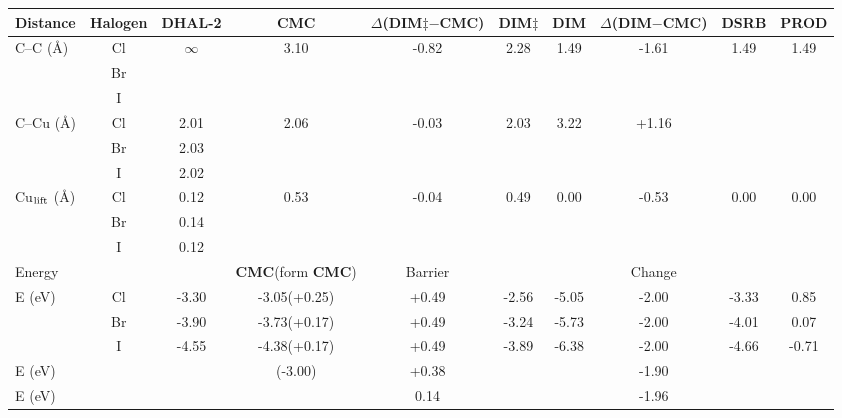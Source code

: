 \documentclass[%
 reprint,
 amsmath,amssymb,
 aps,
prb,
floatfix,
]{revtex4-2}
\begin{document}
\begin{table}
\centering
\begin{tabular}{ lccccccccc  }
 \hline
 \hline
 Distance & Halogen & \textbf{DHAL-2} & \textbf{CMC} & $\Delta$(\textbf{DIM$\ddagger$}$-$\textbf{CMC}) & \textbf{DIM$\ddagger$} & \textbf{DIM} & $\Delta$(\textbf{DIM}$-$\textbf{CMC}) & \textbf{DSRB} & \textbf{PROD}\\ 
 \hline 
 \multirow{3}{*}{C--C (\si{\angstrom})} & Cl & \multirow{3}{*}{$\infty$} & \multirow{3}{*}{3.10} & \multirow{3}{*}{-0.82} & \multirow{3}{*}{2.28} & \multirow{3}{*}{1.49} & \multirow{3}{*}{-1.61} & \multirow{3}{*}{1.49} &\multirow{3}{*}{1.49}\\ 
 & Br & &  &  &  & & & &\\ 
 & I & &  &  &  & & & &\\ 
 \hline
 \multirow{3}{*}{C--Cu (\si{\angstrom}) } & Cl & 2.01 & \multirow{3}{*}{2.06} & \multirow{3}{*}{-0.03} & \multirow{3}{*}{2.03} & \multirow{3}{*}{3.22} & \multirow{3}{*}{+1.16} & \multirow{3}{*}{} &\multirow{3}{*}{}\\ 
 & Br & 2.03 &  &  &  & & & &\\ 
 & I &2.02 &  &  &  & & & &\\ 
 \hline
 \multirow{3}{*}{Cu$_{\rm lift}$ (\si{\angstrom}) } & Cl & 0.12 & \multirow{3}{*}{0.53} & \multirow{3}{*}{-0.04} & \multirow{3}{*}{0.49} & \multirow{3}{*}{0.00} & \multirow{3}{*}{-0.53} & \multirow{3}{*}{0.00} &\multirow{3}{*}{0.00}\\ 
 & Br & 0.14 &  &  &  & & & &\\ 
 & I &0.12 &  &  &  & & & &\\ 
 \hline
 \hline
 Energy & & & \textbf{CMC}(form \textbf{CMC}) & Barrier & & & Change & &\\
 \hline
 \multirow{3}{*}{E (\si{\electronvolt}) } & Cl & -3.30 & -3.05(+0.25) &+0.49 &-2.56 & -5.05 & -2.00& -3.33&0.85\\ 
 & Br &-3.90 & -3.73(+0.17) &+0.49 & -3.24& -5.73 & -2.00& -4.01&0.07\\ 
 & I  & -4.55 & -4.38(+0.17) & +0.49& -3.89& -6.38 & -2.00& -4.66&-0.71\\ 
 \hline
 E (\si{\electronvolt})~\cite{pccp2010} & & & (-3.00) & +0.38 & & & -1.90 & & \\
 \hline
 E (\si{\electronvolt})~\cite{jacs2013} & & & & 0.14 & & & -1.96 & &\\
 \hline
 \hline
\end{tabular}

\end{table}
\end{document}
